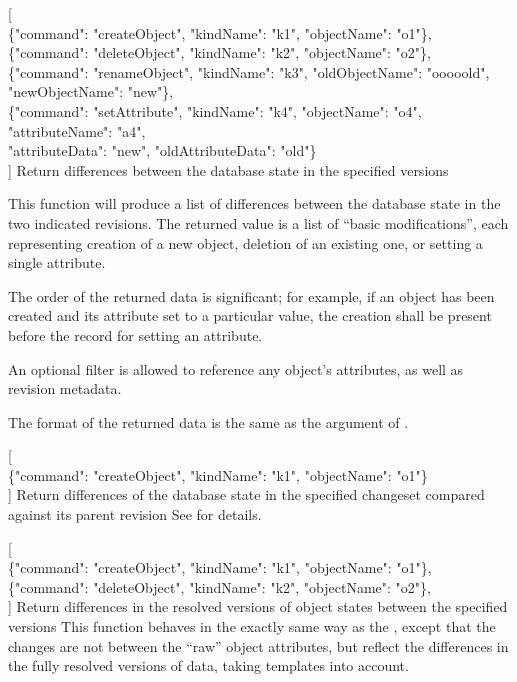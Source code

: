 \documentclass[deska]{subfiles}
\begin{document}
    {[ \\
    \{"command": "createObject", "kindName": "k1", "objectName": "o1"\}, \\
    \{"command": "deleteObject", "kindName": "k2", "objectName": "o2"\}, \\
    \{"command": "renameObject", "kindName": "k3", "oldObjectName": "ooooold", "newObjectName": "new"\}, \\
    \{"command": "setAttribute", "kindName": "k4", "objectName": "o4", "attributeName": "a4", \\
        "attributeData": "new", "oldAttributeData": "old"\} \\
    ]}
    {Return differences between the database state in the specified versions}
    {This function will produce a list of differences between the database state in the two indicated revisions.  The
    returned value is a list of ``basic modifications'', each representing creation of a new object, deletion of an
    existing one, or setting a single attribute.

    The order of the returned data is significant; for example, if an object has been created and its attribute set to a
    particular value, the creation shall be present before the record for setting an attribute.

    An optional filter is allowed to reference any object's attributes, as well as revision metadata.

    The format of the returned data is the same as the argument of .}

    {[ \\
    \{"command": "createObject", "kindName": "k1", "objectName": "o1"\} \\
    ]}
    {Return differences of the database state in the specified changeset compared against its parent revision}
    {See  for details.}

    {[ \\
    \{"command": "createObject", "kindName": "k1", "objectName": "o1"\}, \\
    \{"command": "deleteObject", "kindName": "k2", "objectName": "o2"\}, \\
    ]}
    {Return differences in the resolved versions of object states between the specified versions}
    {This function behaves in the exactly same way as the , except that the changes are not
    between the ``raw'' object attributes, but reflect the differences in the fully resolved versions of data, taking
    templates  into account.}
\end{document}
